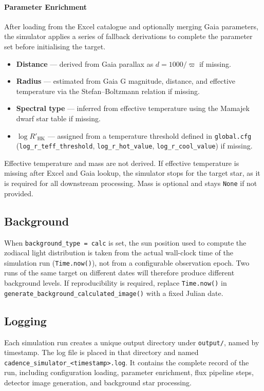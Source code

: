\paragraph{Parameter Enrichment} After loading from the Excel catalogue and optionally merging Gaia parameters, the simulator applies a series of fallback derivations to complete the parameter set before initialising the target.

\begin{itemize}
    \item \textbf{Distance} — derived from Gaia parallax as $d = 1000 / \varpi$ if missing.
    \item \textbf{Radius} — estimated from Gaia G magnitude, distance, and effective temperature via the Stefan--Boltzmann relation if missing.
    \item \textbf{Spectral type} — inferred from effective temperature using the Mamajek dwarf star table if missing.
    \item \textbf{$\log R'_\mathrm{HK}$} — assigned from a temperature threshold defined in \texttt{global.cfg} (\texttt{log\_r\_teff\_threshold}, \texttt{log\_r\allowbreak\_hot\_value}, \texttt{log\_r\_cool\_value}) if missing.
\end{itemize}

Effective temperature and mass are not derived. If effective temperature is missing after Excel and Gaia lookup, the simulator stops for the target star, as it is required for all downstream processing. Mass is optional and stays \texttt{None} if not provided.


\subsection{Background}
\label{sec:background}
When \texttt{background\_type = calc} is set, the sun position used to compute the zodiacal light distribution is taken from the actual wall-clock time of the simulation run (\texttt{Time.now()}), not from a configurable observation epoch. Two runs of the same target on different dates will therefore produce different background levels. If reproducibility is required, replace \texttt{Time.now()} in \texttt{generate\_background\_calculated\_image()} with a fixed Julian date.


\subsection{Logging}
\label{sec:logging}
Each simulation run creates a unique output directory under \texttt{output/}, named by timestamp. The log file is placed in that directory and named \texttt{cadence\_simulator\_<timestamp>.log}. It contains the complete record of the run, including configuration loading, parameter enrichment, flux pipeline steps, detector image generation, and background star processing.

